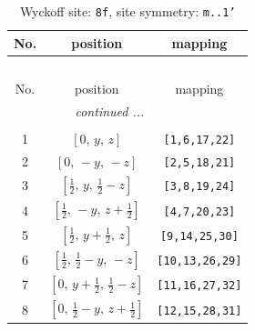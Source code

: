 \documentclass[fleqn,8pt]{jsarticle}
\begin{document}
\begin{longtable}{ccc}
\caption{Wyckoff site: {\tt 8f}, site symmetry: {\tt m..1'}}
 \\
 \hline \hline
No. & position & mapping \\ \hline \endfirsthead

\multicolumn{2}{l}{\tablename\ \thetable{}} \\
 \hline \hline
No. & position & mapping \\ \hline \endhead

 \hline \hline
\multicolumn{2}{r}{\footnotesize\it continued ...} \\ \endfoot

 \hline \hline
\multicolumn{2}{r}{} \\ \endlastfoot

1 & $\left[ 0,\, y,\, z \right]$ & {\tt [1,6,17,22]} \\ \hline
2 & $\left[ 0,\, - y,\, - z \right]$ & {\tt [2,5,18,21]} \\ \hline
3 & $\left[ \frac{1}{2},\, y,\, \frac{1}{2} - z \right]$ & {\tt [3,8,19,24]} \\ \hline
4 & $\left[ \frac{1}{2},\, - y,\, z + \frac{1}{2} \right]$ & {\tt [4,7,20,23]} \\ \hline
5 & $\left[ \frac{1}{2},\, y + \frac{1}{2},\, z \right]$ & {\tt [9,14,25,30]} \\ \hline
6 & $\left[ \frac{1}{2},\, \frac{1}{2} - y,\, - z \right]$ & {\tt [10,13,26,29]} \\ \hline
7 & $\left[ 0,\, y + \frac{1}{2},\, \frac{1}{2} - z \right]$ & {\tt [11,16,27,32]} \\ \hline
8 & $\left[ 0,\, \frac{1}{2} - y,\, z + \frac{1}{2} \right]$ & {\tt [12,15,28,31]} \\
\end{longtable}
\renewcommand{\arraystretch}{1.2}
\end{document}
